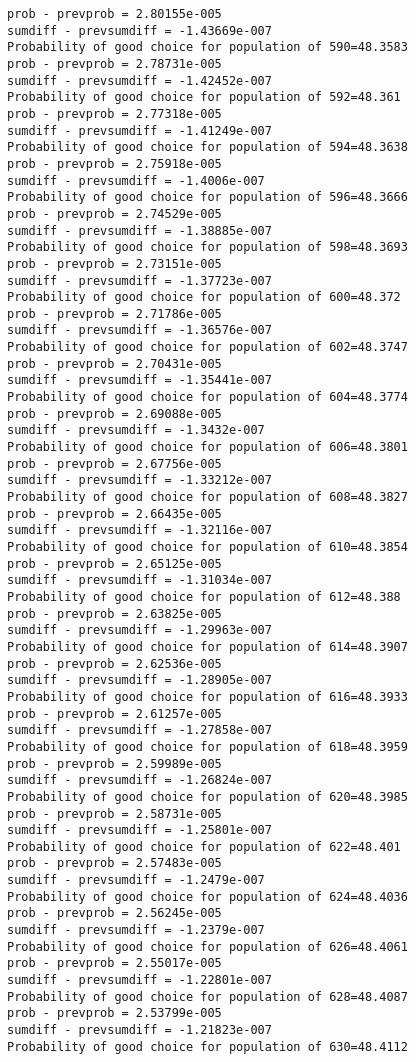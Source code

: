 \documentclass[11pt,onecolumn]{article}
\begin{document}
\begin{verbatim}
prob - prevprob = 2.80155e-005
sumdiff - prevsumdiff = -1.43669e-007
Probability of good choice for population of 590=48.3583
prob - prevprob = 2.78731e-005
sumdiff - prevsumdiff = -1.42452e-007
Probability of good choice for population of 592=48.361
prob - prevprob = 2.77318e-005
sumdiff - prevsumdiff = -1.41249e-007
Probability of good choice for population of 594=48.3638
prob - prevprob = 2.75918e-005
sumdiff - prevsumdiff = -1.4006e-007
Probability of good choice for population of 596=48.3666
prob - prevprob = 2.74529e-005
sumdiff - prevsumdiff = -1.38885e-007
Probability of good choice for population of 598=48.3693
prob - prevprob = 2.73151e-005
sumdiff - prevsumdiff = -1.37723e-007
Probability of good choice for population of 600=48.372
prob - prevprob = 2.71786e-005
sumdiff - prevsumdiff = -1.36576e-007
Probability of good choice for population of 602=48.3747
prob - prevprob = 2.70431e-005
sumdiff - prevsumdiff = -1.35441e-007
Probability of good choice for population of 604=48.3774
prob - prevprob = 2.69088e-005
sumdiff - prevsumdiff = -1.3432e-007
Probability of good choice for population of 606=48.3801
prob - prevprob = 2.67756e-005
sumdiff - prevsumdiff = -1.33212e-007
Probability of good choice for population of 608=48.3827
prob - prevprob = 2.66435e-005
sumdiff - prevsumdiff = -1.32116e-007
Probability of good choice for population of 610=48.3854
prob - prevprob = 2.65125e-005
sumdiff - prevsumdiff = -1.31034e-007
Probability of good choice for population of 612=48.388
prob - prevprob = 2.63825e-005
sumdiff - prevsumdiff = -1.29963e-007
Probability of good choice for population of 614=48.3907
prob - prevprob = 2.62536e-005
sumdiff - prevsumdiff = -1.28905e-007
Probability of good choice for population of 616=48.3933
prob - prevprob = 2.61257e-005
sumdiff - prevsumdiff = -1.27858e-007
Probability of good choice for population of 618=48.3959
prob - prevprob = 2.59989e-005
sumdiff - prevsumdiff = -1.26824e-007
Probability of good choice for population of 620=48.3985
prob - prevprob = 2.58731e-005
sumdiff - prevsumdiff = -1.25801e-007
Probability of good choice for population of 622=48.401
prob - prevprob = 2.57483e-005
sumdiff - prevsumdiff = -1.2479e-007
Probability of good choice for population of 624=48.4036
prob - prevprob = 2.56245e-005
sumdiff - prevsumdiff = -1.2379e-007
Probability of good choice for population of 626=48.4061
prob - prevprob = 2.55017e-005
sumdiff - prevsumdiff = -1.22801e-007
Probability of good choice for population of 628=48.4087
prob - prevprob = 2.53799e-005
sumdiff - prevsumdiff = -1.21823e-007
Probability of good choice for population of 630=48.4112

\end{verbatim}
\end{document}
